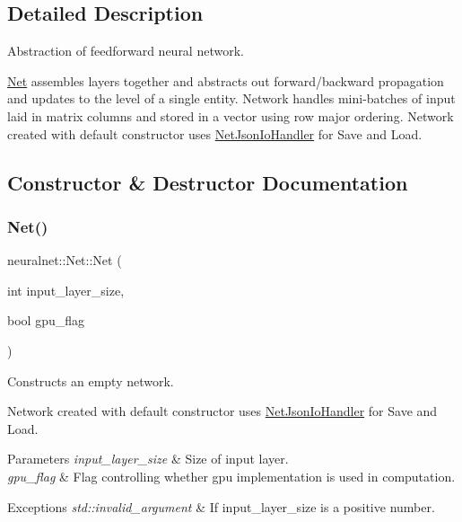 \subsection{Detailed Description}
Abstraction of feedforward neural network. 

\hyperlink{classneuralnet_1_1Net}{Net} assembles layers together and abstracts out forward/backward propagation and updates to the level of a single entity. Network handles mini-\/batches of input laid in matrix columns and stored in a vector using row major ordering. Network created with default constructor uses \hyperlink{classneuralnet_1_1NetJsonIoHandler}{Net\+Json\+Io\+Handler} for Save and Load. 

\subsection{Constructor \& Destructor Documentation}
\mbox{\label{classneuralnet_1_1Net_ab42c28638b8bf8098a5fe08b3a656c3b}} 
\subsubsection{\texorpdfstring{Net()}{Net()}\hspace{0.1cm}{\footnotesize\ttfamily [1/2]}}
{\footnotesize\ttfamily neuralnet\+::\+Net\+::\+Net (\begin{DoxyParamCaption}\item[{int}]{input\+\_\+layer\+\_\+size,  }\item[{bool}]{gpu\+\_\+flag }\end{DoxyParamCaption})}



Constructs an empty network. 

Network created with default constructor uses \hyperlink{classneuralnet_1_1NetJsonIoHandler}{Net\+Json\+Io\+Handler} for Save and Load.


\begin{DoxyParams}{Parameters}
{\em input\+\_\+layer\+\_\+size} & Size of input layer. \\
\hline
{\em gpu\+\_\+flag} & Flag controlling whether gpu implementation is used in computation. \\
\hline
\end{DoxyParams}

\begin{DoxyExceptions}{Exceptions}
{\em std\+::invalid\+\_\+argument} & If input\+\_\+layer\+\_\+size is a positive number. \\
\hline
\end{DoxyExceptions}
\mbox{\label{classneuralnet_1_1Net_afd6ca6af4811bbb6b2b4ee9de6429cea}} 
